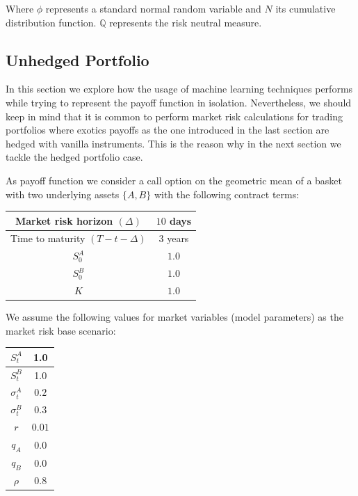 Where $\phi$ represents a standard normal random variable and $N$ its cumulative distribution function. $\mathbb{Q}$ represents the risk neutral measure.


\subsection{Unhedged Portfolio}
 In this section we explore how the usage of machine learning techniques performs while trying to represent the payoff function in isolation. Nevertheless, we should keep in mind that it is common to perform market risk calculations for trading portfolios where exotics payoffs as the one introduced in the last section are hedged with vanilla instruments. This is the reason why in the next section we tackle the hedged portfolio case. 
 
 As payoff function we consider a call option on the geometric mean of a basket with two underlying assets $\{A,B\}$ with the following contract terms:
 
 
\begin{center}
\begin{tabular}{||c | c||} 
 \hline
 Market risk horizon $(\Delta)$ & $10$ days \\ 
 \hline
 Time to maturity $(T-t-\Delta)$ & $3$ years \\
 \hline
 $S_0^A$ & $1.0$ \\
 \hline
 $S_0^B$ & $1.0$ \\
 \hline
 $K$ & $1.0$ \\
 \hline
 \end{tabular}
\end{center}

We assume the following values for market variables (model parameters) as the market risk base scenario:

\begin{center}
\begin{tabular}{||c | c||} 
 \hline
 $S_t^A$ & 1.0 \\
 \hline
 $S_t^B$ & 1.0 \\
 \hline
 $\sigma_t^A$ & $0.2$ \\
 \hline
 $\sigma_t^B$ & $0.3$ \\
 \hline
 $r$ & $0.01$ \\
 \hline
 $q_A$ & $0.0$ \\
 \hline
 $q_B$ & $0.0$ \\
 \hline
 $\rho$ & $0.8$ \\
 \hline
\end{tabular}
\end{center}

